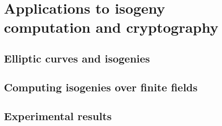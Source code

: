 

\part[Applications to isogenies and cryptography]{Applications to isogeny computation and cryptography}
\label{part:appl-isog-comp}
\chapter{Elliptic curves and isogenies}
\label{cha:ellipt-curv-isog}


\chapter{Computing isogenies over finite fields}
\label{cha:algor-small-char}








\chapter{Experimental results}
\label{cha:experimental-results}




%

